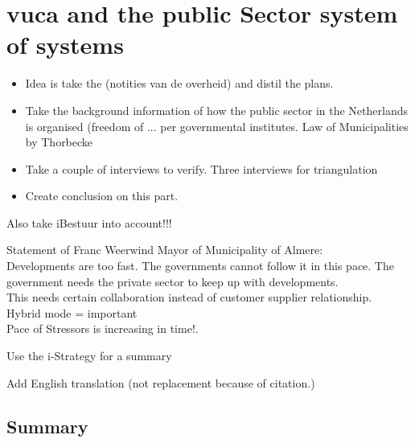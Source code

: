\chapter{\acrshort{vuca} and the public Sector system of systems}
\label{ch:vucaandpublicsector}

\begin{itemize}
\item{Idea is take the (notities van de overheid) and distil the plans.}
\item{Take the background information of how the public sector in the Netherlands is organised (freedom of ... per governmental institutes. Law of Municipalities by Thorbecke }
\item{Take a couple of interviews to verify. Three interviews for triangulation}
\item{Create conclusion on this part.}
\end{itemize}

\begin{remark}
	Also take iBestuur into account!!!
\end{remark}

Statement of Franc Weerwind Mayor of Municipality of Almere:\\
Developments are too fast. The governments cannot follow it in this pace. The government needs the private sector to keep up with developments.\\
This needs certain collaboration instead of customer supplier relationship.\\
Hybrid mode = important\\
Pace of Stressors is increasing in time!.\\

\begin{remark}
	Use the i-Strategy for a summary 
\end{remark}



\begin{remark}
	Add English translation (not replacement because of citation.)
\end{remark}

\section{Summary}
\label{sec:vucaps}
\lipsum[1]
